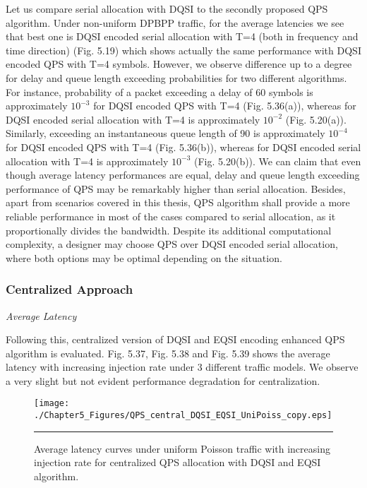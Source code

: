Let us compare serial allocation with DQSI to the secondly proposed QPS algorithm. Under non-uniform DPBPP traffic, for the average latencies we see that best one is DQSI encoded serial allocation with T=4 (both in frequency and time direction) (Fig. 5.19) which shows actually the same performance with DQSI encoded QPS with T=4 symbols. However, we observe difference up to a degree for delay and queue length exceeding probabilities for two different algorithms. For instance, probability of a packet exceeding a delay of 60 symbols is approximately $10^{-3}$ for DQSI encoded QPS with T=4 (Fig. 5.36(a)), whereas for DQSI encoded serial allocation with T=4 is approximately $10^{-2}$ (Fig. 5.20(a)). Similarly, exceeding an instantaneous queue length of 90 is approximately $10^{-4}$ for DQSI encoded QPS with T=4 (Fig. 5.36(b)), whereas for DQSI encoded serial allocation with T=4 is approximately $10^{-3}$ (Fig. 5.20(b)). We can claim that even though average latency performances are equal, delay and queue length exceeding performance of QPS may be remarkably higher than serial allocation. Besides, apart from scenarios covered in this thesis, QPS algorithm shall provide a more reliable performance in most of the cases compared to serial allocation, as it proportionally divides the bandwidth. Despite its additional computational complexity, a designer may choose QPS over DQSI encoded serial allocation, where both options may be optimal depending on the situation.

\subsubsection{Centralized Approach}
\textit{Average Latency}


Following this, centralized version of DQSI and EQSI encoding enhanced QPS algorithm is evaluated. Fig. 5.37, Fig. 5.38 and Fig. 5.39 shows the average latency with increasing injection rate under 3 different traffic models. We observe a very slight but not evident performance degradation for centralization.



\begin{figure}[htbp]
  \centering
    \texttt{[image: ./Chapter5\_Figures/QPS\_central\_DQSI\_EQSI\_UniPoiss\_copy.eps]}
    \rule{35em}{0.5pt}
  \caption[Centralized QPS allocation with DQSI and EQSI average latency under uniform Poisson]{Average latency curves under uniform Poisson traffic with increasing injection rate for centralized QPS allocation with DQSI and EQSI algorithm.}
  \label{fig:Electron}
\end{figure}



